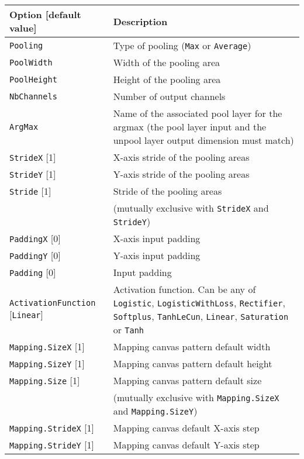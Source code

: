\documentclass[a4paper,11pt,oneside]{article}
\begin{document}
\begin{center}
 \begin{longtable}{| p{5cm} | p{10cm} | }
 \hline
 Option [default value] & Description\\
 \hline\hline
  \cellcolor{requiredcolor}\lstinline!Pooling! & Type of pooling
  (\lstinline!Max! or \lstinline!Average!)\\
  \cellcolor{requiredcolor}\lstinline!PoolWidth! & Width of the pooling area \\
  \cellcolor{requiredcolor}\lstinline!PoolHeight! & Height of the pooling
area \\
  \cellcolor{requiredcolor}\lstinline!NbChannels! & Number of output channels \\
  \cellcolor{requiredcolor}\lstinline!ArgMax! & Name of the associated pool
  layer for the argmax (the pool layer input and the unpool layer output
  dimension must match) \\
  \lstinline!StrideX! [1] & X-axis stride of the pooling areas \\
  \lstinline!StrideY! [1] & Y-axis stride of the pooling areas \\
  \lstinline!Stride! [1] & Stride of the pooling areas \\
   & (mutually exclusive with \lstinline!StrideX! and \lstinline!StrideY!) \\
  \lstinline!PaddingX! [0] & X-axis input padding \\
  \lstinline!PaddingY! [0] & Y-axis input padding \\
  \lstinline!Padding! [0] & Input padding \\
  \lstinline!ActivationFunction! [\lstinline!Linear!] & Activation function.
  Can be any of \lstinline!Logistic!,  \lstinline!LogisticWithLoss!,
  \lstinline!Rectifier!, \lstinline!Softplus!, \lstinline!TanhLeCun!,
  \lstinline!Linear!, \lstinline!Saturation! or \lstinline!Tanh! \\
  \lstinline!Mapping.SizeX! [1] & Mapping canvas pattern default width \\
  \lstinline!Mapping.SizeY! [1] & Mapping canvas pattern default height \\
  \lstinline!Mapping.Size! [1] & Mapping canvas pattern default size \\
   & (mutually exclusive with \lstinline!Mapping.SizeX!
   and \lstinline!Mapping.SizeY!) \\
  \lstinline!Mapping.StrideX! [1] & Mapping canvas default X-axis step \\
  \lstinline!Mapping.StrideY! [1] & Mapping canvas default Y-axis step \\

\end{longtable}
\end{center}
\end{document}
